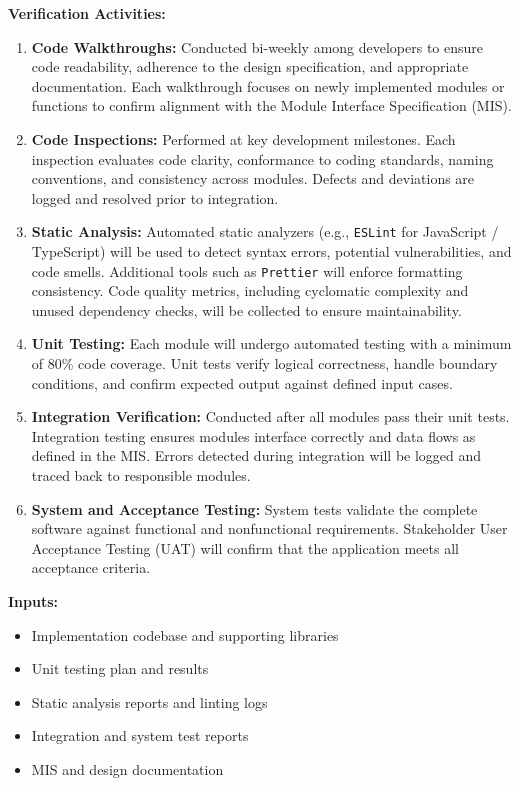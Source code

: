 \documentclass[12pt, titlepage]{article}
\begin{document}
\noindent\textbf{Verification Activities:}
\begin{enumerate}
  \item \textbf{Code Walkthroughs:} Conducted bi-weekly among developers to ensure code readability, adherence to the design specification, and appropriate documentation.
  Each walkthrough focuses on newly implemented modules or functions to confirm alignment with the Module Interface Specification (MIS).
  
  \item \textbf{Code Inspections:} Performed at key development milestones. Each inspection evaluates code clarity, conformance to coding standards, naming conventions,
  and consistency across modules. Defects and deviations are logged and resolved prior to integration.
  
  \item \textbf{Static Analysis:} Automated static analyzers (e.g., \texttt{ESLint} for JavaScript / TypeScript) will be used to detect syntax errors, potential vulnerabilities, and code smells. Additional tools such as \texttt{Prettier} will enforce formatting consistency. Code quality metrics, including cyclomatic complexity and unused dependency checks, will be collected to ensure maintainability.
  
  \item \textbf{Unit Testing:} Each module will undergo automated testing with a minimum of 80\% code coverage. Unit tests verify logical correctness, handle boundary conditions, and confirm expected output against defined input cases.
  
  \item \textbf{Integration Verification:} Conducted after all modules pass their unit tests. Integration testing ensures modules interface correctly and data flows as defined in the MIS. Errors detected during integration will be logged and traced back to responsible modules.
  
  \item \textbf{System and Acceptance Testing:} System tests validate the complete software against functional and nonfunctional requirements. Stakeholder User Acceptance Testing (UAT) will confirm that the application meets all acceptance criteria.
\end{enumerate}

\noindent\textbf{Inputs:}
\begin{itemize}
  \item Implementation codebase and supporting libraries
  \item Unit testing plan and results
  \item Static analysis reports and linting logs
  \item Integration and system test reports
  \item MIS and design documentation
\end{itemize}
\end{document}
